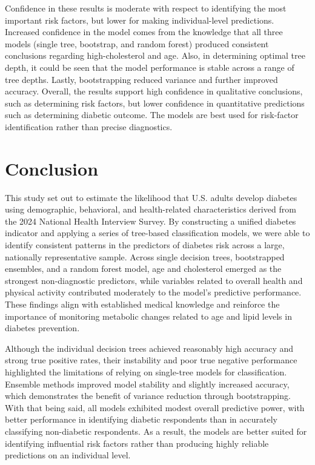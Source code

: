\documentclass{article}
\theoremstyle{plain}
\theoremstyle{definition}
\theoremstyle{remark}
\begin{document}
Confidence in these results is moderate with respect to identifying the most important risk factors, but lower for making individual-level predictions. Increased confidence in the model comes from the knowledge that all three models (single tree, bootstrap, and random forest) produced consistent conclusions regarding high-cholesterol and age. Also, in determining optimal tree depth, it could be seen that the model performance is stable across a range of tree depths. Lastly, bootstrapping reduced variance and further improved accuracy. Overall, the results support high confidence in qualitative conclusions, such as determining risk factors, but lower confidence in quantitative predictions such as determining diabetic outcome. The models are best used for risk-factor identification rather than precise diagnostics.

\section{Conclusion}

This study set out to estimate the likelihood that U.S. adults develop diabetes using demographic, behavioral, and health-related characteristics derived from the 2024 National Health Interview Survey. By constructing a unified diabetes indicator and applying a series of tree-based classification models, we were able to identify consistent patterns in the predictors of diabetes risk across a large, nationally representative sample. Across single decision trees, bootstrapped ensembles, and a random forest model, age and cholesterol emerged as the strongest non-diagnostic predictors, while variables related to overall health and physical activity contributed moderately to the model's predictive performance. These findings align with established medical knowledge and reinforce the importance of monitoring metabolic changes related to age and lipid levels in diabetes prevention. 

Although the individual decision trees achieved reasonably high accuracy and strong true positive rates, their instability and poor true negative performance highlighted the limitations of relying on single-tree models for classification. Ensemble methods improved model stability and slightly increased accuracy, which demonstrates the benefit of variance reduction through bootstrapping. With that being said, all models exhibited modest overall predictive power, with better performance in identifying diabetic respondents than in accurately classifying non-diabetic respondents. As a result, the models are better suited for identifying influential risk factors rather than producing highly reliable predictions on an individual level. 
\end{document}
